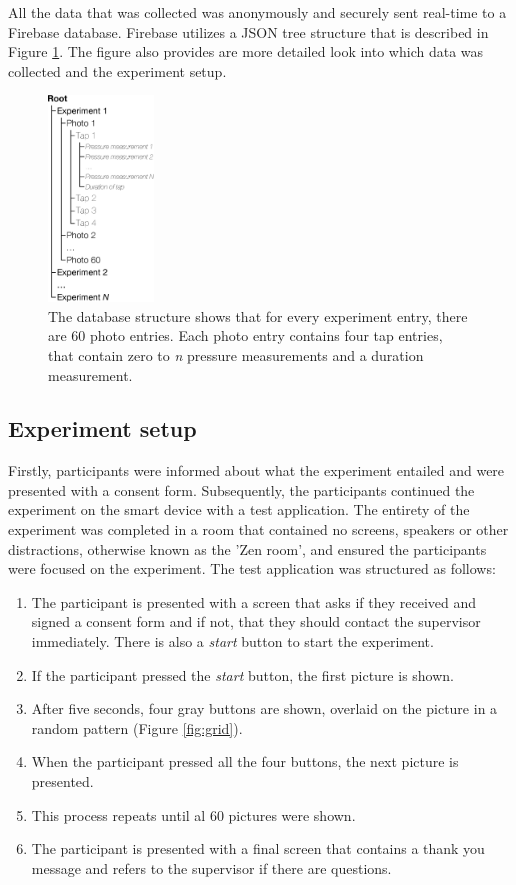 \documentclass{sigchi}
\begin{document}
All the data that was collected was anonymously and securely sent real-time to a Firebase \cite{google:firebase} database. Firebase utilizes a JSON \cite{json} tree structure that is described in Figure \ref{fig:datastructure}. The figure also provides are more detailed look into which data was collected and the experiment setup.
\begin{figure}[t]
    \centering
    \includegraphics[width=0.25\textwidth]{images/Datastructure.eps}
    \caption{The database structure shows that for every experiment entry, there are 60 photo entries. Each photo entry contains four tap entries, that contain zero to \textit{n} pressure measurements and a duration measurement.}
    \label{fig:datastructure}
\end{figure}


\subsection{Experiment setup} %
\label{sub:experiment_setup}
Firstly, participants were informed about what the experiment entailed and were presented with a consent form. Subsequently, the participants continued the experiment on the smart device with a test application. The entirety of the experiment was completed in a room that contained no screens, speakers or other distractions, otherwise known as the 'Zen room', and ensured the participants were focused on the experiment. The test application was structured as follows:
\begin{enumerate}
  \item The participant is presented with a screen that asks if they received and signed a consent form and if not, that they should contact the supervisor immediately. There is also a \textit{start} button to start the experiment.
  \item If the participant pressed the \textit{start} button, the first picture is shown.
  \item After five seconds, four gray buttons are shown, overlaid on the picture in a random pattern (Figure \ref{fig:grid}).
  \item When the participant pressed all the four buttons, the next picture is presented.
  \item This process repeats until al 60 pictures were shown.
  \item The participant is presented with a final screen that contains a thank you message and refers to the supervisor if there are questions.
\end{enumerate}
\end{document}
